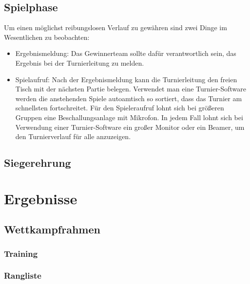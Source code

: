 \subsection{Spielphase}
\label{turniere:durchfuehrung:turnierphase}

Um einen möglichst reibungslosen Verlauf zu gewähren sind zwei Dinge im Wesentlichen zu beobachten:
\begin{itemize}
\item Ergebnismeldung: Das Gewinnerteam sollte dafür verantwortlich sein, das Ergebnis bei der Turnierleitung zu melden. 
\item Spielaufruf: Nach der Ergebnismeldung kann die Turnierleitung den freien Tisch mit der nächsten Partie belegen. 
Verwendet man eine Turnier-Software werden die anstehenden Spiele autoamtisch so sortiert, dass das Turnier am schnellsten fortschreitet.
Für den Spieleraufruf lohnt sich bei größeren Gruppen eine Beschallungsanlage mit Mikrofon. 
In jedem Fall lohnt sich bei Verwendung einer Turnier-Software ein großer Monitor oder ein Beamer, um den Turnierverlauf für alle anzuzeigen.
\end{itemize}


\subsection{Siegerehrung}
\label{turniere:durchfuehrung:siegerehrung}


\section{Ergebnisse}
\label{turniere:ergebnisse}

\subsection{Wettkampfrahmen}
\label{turniere:ergebnisse:rahmen}

\subsubsection{Training}
\label{turniere:ergebnisse:rahmen:training}

\subsubsection{Rangliste}
\label{turniere:ergebnisse:rahmen:rangliste}

